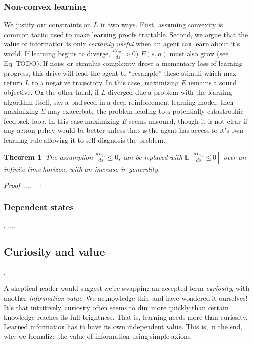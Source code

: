 \documentclass[9pt,twocolumn,twoside]{pnas-new}
\newtheorem{theorem}{Theorem}
\begin{document}
{{\subsubsection{Non-convex learning}
We justify our constraints on $L$ in two ways. First, assuming convexity is common tactic used to make learning proofs tractable. Second, we argue that the value of information is only \textit{certainly useful} when an agent can learn about it's world. If learning begins to diverge, $\frac{dL_{\pi_{a}}}{ds} > 0$) $E(s, a)$ must also grow (see Eq~TODO). If noise or stimulus complexity drove a momentary loss of learning progress, this drive will lead the agent to ``resample'' these stimuli which max return $L$ to a negative trajectory. In this case, maximizing $E$ remains a sound objective. On the other hand, if $L$ diverged due a problem with the learning algorithm itself, say a bad seed in a deep reinforcement learning model, then maximizing $E$ may exacerbate the problem leading to a potentially catastrophic feedback loop. In this case maximizing $E$ seems unsound, though it is not clear if any action policy would be better unless that is the agent has access to it's own learning rule allowing it to self-diagnosis the problem.

\begin{theorem}
    The assumption $\frac{dL_{\pi_{a}}}{ds} \leq 0$, can be replaced with $\mathbb{E} [\frac{dL_{\pi_{a}}}{ds} \leq 0]$ over an infinite time horizon, with an increase in generality.
\end{theorem}
\begin{proof}
....
\end{proof}


\subsubsection*{Dependent states}.
....


\subsection*{Curiosity and value}.

A skeptical reader would suggest we're swapping an accepted term \textit{curiosity}, with another \textit{information value}. We acknowledge this, and have wondered it ourselves! It's that intuitively, curiosity often seems to dim more quickly than certain knowledge reaches its full brightness. That is, learning needs more than curiosity. Learned information has to have its own independent value. This is, in the end, why we formalize the value of information using simple axions. 

}}
\end{document}
